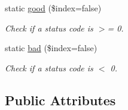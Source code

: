 \begin{DoxyCompactItemize}
static \hyperlink{classJStatus_a0be1b19e44183e6be4a53331b8108c67}{good} (\$index=false)
\begin{DoxyCompactList}\small\item\em Check if a status code is $>$= 0. \end{DoxyCompactList}\item 
static \hyperlink{classJStatus_abfddd8974fe4b9dfe7055f849e2df95c}{bad} (\$index=false)
\begin{DoxyCompactList}\small\item\em Check if a status code is $<$ 0. \end{DoxyCompactList}\end{DoxyCompactItemize}
\subsection*{Public Attributes}
